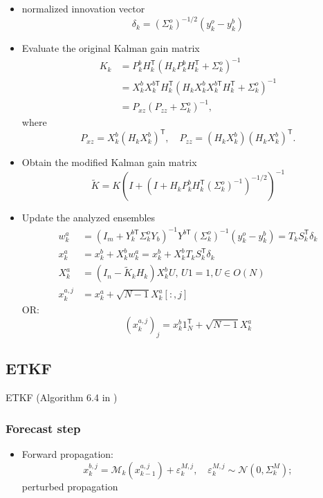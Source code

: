 \documentclass{article}
\newcommand{\trans}{\mathsf{T}}
\begin{document}
\begin{itemize}
	\item normalized innovation vector
	      $$
		      \delta_k = (\Sigma_k^o)^{-1/2}(y_k^o-y_k^b)
	      $$
	\item Evaluate the original Kalman gain matrix
	      \begin{align*}
		      K_k & = P_k^bH_k^\trans (H_kP_k^bH_k^\trans +\Sigma_k^o)^{-1}                           \\
		          & = X_k^bX_k^{b\trans}H_k^\trans (H_kX_k^bX_k^{b\trans}H_k^\trans +\Sigma_k^o)^{-1} \\
		          & = P_{xz}(P_{zz}+\Sigma_k^o)^{-1},
	      \end{align*}
	      where
	      $$
		      P_{xz} = X_k^b(H_kX_k^b)^\trans ,\quad P_{zz} = (H_kX_k^b)(H_kX_k^b)^\trans .
	      $$
	\item Obtain the modified Kalman gain matrix
	      $$
		      \tilde K = K(I + (I + H_kP_k^bH_k^\trans (\Sigma_k^o)^{-1})^{-1/2})^{-1}
	      $$
	\item Update the analyzed ensembles
	      \begin{align*}
		      w_k^a     & = (I_m + Y_k^{b\trans}\Sigma_k^o Y_b)^{-1}Y^{b\trans}(\Sigma_k^o)^{-1}(y_k^o-y_k^b)=T_kS_k^\trans \delta_k \\
		      x_k^a     & = x_k^b + X_k^bw_k^a = x_k^b + X_k^bT_kS_k^\trans \delta_k                                                 \\
		      X_k^a     & = (I_n - \tilde{K}_kH_k)X_k^bU,\, U1=1, U\in O(N)                                                          \\
		      x_k^{a,j} & = x_k^a + \sqrt{N-1}X_k^a[:, j]
	      \end{align*}
	      OR:
	      $$
		      (x_k^{a,j})_j = x_k^b1_N^\trans  + \sqrt{N-1}X_k^a
	      $$
\end{itemize}

\subsection{ETKF}
ETKF (Algorithm 6.4 in \cite{Bocquet2016})

\subsubsection{Forecast step}
\begin{itemize}
	\item Forward propagation:
	      $$
		      x_k^{b,j}=\mathcal{M}_k(x_{k-1}^{a,j})+\varepsilon_k^{M,j},\quad \varepsilon_k^{M,j}\sim\mathcal{N}(0,\Sigma_k^M);
	      $$
	      perturbed propagation
\end{itemize}
\end{document}
